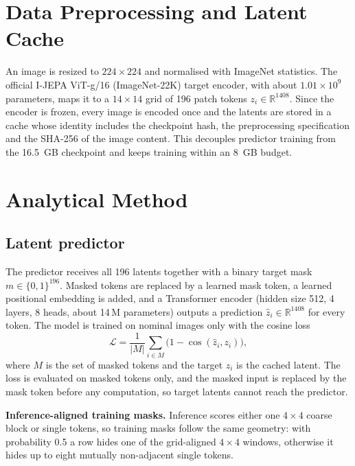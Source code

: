 \documentclass[12pt,a4paper,oneside]{report}
\begin{document}
\begin{table}[H]
\centering
\caption{Pilot split sizes (images).}
\label{tab:data}

\end{table}

\section{Data Preprocessing and Latent Cache}

An image is resized to $224\times224$ and normalised with ImageNet
statistics. The official I-JEPA ViT-g/16 (ImageNet-22K) target encoder, with
about $1.01\times10^{9}$ parameters, maps it to a $14\times14$ grid of 196
patch tokens $z_i\in\mathbb{R}^{1408}$. Since the encoder is frozen, every
image is encoded once and the latents are stored in a cache whose identity
includes the checkpoint hash, the preprocessing specification and the
SHA-256 of the image content. This decouples predictor training from the
16.5~GB checkpoint and keeps training within an 8~GB budget.

\section{Analytical Method}

\subsection{Latent predictor}

The predictor receives all 196 latents together with a binary target mask
$m\in\{0,1\}^{196}$. Masked tokens are replaced by a learned mask token, a
learned positional embedding is added, and a Transformer encoder (hidden
size 512, 4 layers, 8 heads, about 14\,M parameters) outputs a prediction
$\hat z_i\in\mathbb{R}^{1408}$ for every token. The model is trained on
nominal images only with the cosine loss
\begin{equation}
\mathcal{L}=\frac{1}{|M|}\sum_{i\in M}\bigl(1-\cos(\hat z_i, z_i)\bigr),
\end{equation}
where $M$ is the set of masked tokens and the target $z_i$ is the cached
latent. The loss is evaluated on masked tokens only, and the masked input is
replaced by the mask token before any computation, so target latents cannot
reach the predictor.

\textbf{Inference-aligned training masks.} Inference scores either one
$4\times4$ coarse block or single tokens, so training masks follow the same
geometry: with probability 0.5 a row hides one of the grid-aligned
$4\times4$ windows, otherwise it hides up to eight mutually non-adjacent
single tokens.
\end{document}
